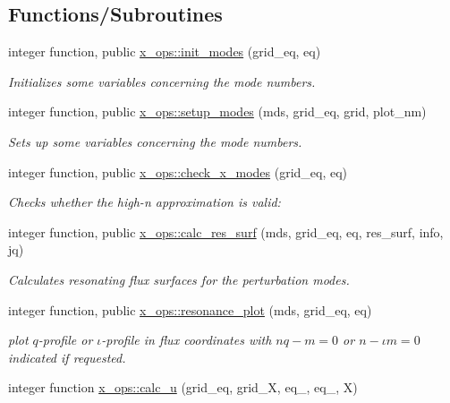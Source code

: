 \subsection*{Functions/\+Subroutines}
\begin{DoxyCompactItemize}
\item 
integer function, public \hyperlink{namespacex__ops_a73a80c582379669f8e07b09dd7456878}{x\+\_\+ops\+::init\+\_\+modes} (grid\+\_\+eq, eq)
\begin{DoxyCompactList}\small\item\em Initializes some variables concerning the mode numbers. \end{DoxyCompactList}\item 
integer function, public \hyperlink{namespacex__ops_a504451aabcab7d6f0fa59feae08ef8dd}{x\+\_\+ops\+::setup\+\_\+modes} (mds, grid\+\_\+eq, grid, plot\+\_\+nm)
\begin{DoxyCompactList}\small\item\em Sets up some variables concerning the mode numbers. \end{DoxyCompactList}\item 
integer function, public \hyperlink{namespacex__ops_a7d9275e2d927d92548416f21b983b604}{x\+\_\+ops\+::check\+\_\+x\+\_\+modes} (grid\+\_\+eq, eq)
\begin{DoxyCompactList}\small\item\em Checks whether the high-\/n approximation is valid\+: \end{DoxyCompactList}\item 
integer function, public \hyperlink{namespacex__ops_a1a90026bbbeddc25e82cfdd304df251f}{x\+\_\+ops\+::calc\+\_\+res\+\_\+surf} (mds, grid\+\_\+eq, eq, res\+\_\+surf, info, jq)
\begin{DoxyCompactList}\small\item\em Calculates resonating flux surfaces for the perturbation modes. \end{DoxyCompactList}\item 
integer function, public \hyperlink{namespacex__ops_abdaf1308e13cede3a153e8c6cf35a637}{x\+\_\+ops\+::resonance\+\_\+plot} (mds, grid\+\_\+eq, eq)
\begin{DoxyCompactList}\small\item\em plot $q$-\/profile or $\iota$-\/profile in flux coordinates with $nq-m = 0$ or $n-\iota m = 0$ indicated if requested. \end{DoxyCompactList}\item 
integer function \hyperlink{namespacex__ops_a4e39701da15ff952add5133db1897b52}{x\+\_\+ops\+::calc\+\_\+u} (grid\+\_\+eq, grid\+\_\+X, eq\+\_, eq\+\_, X)

\end{DoxyCompactItemize}

